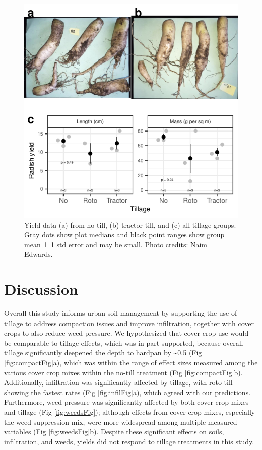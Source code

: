 \documentclass[
  12pt,
]{article}
\begin{document}
\begin{figure}
\centering
\includegraphics{merge_files/figure-latex/yieldFig-1.pdf}
\caption{\label{fig:yieldFig}Yield data (a) from no-till, (b) tractor-till, and (c) all tillage groups. Gray dots show plot medians and black point ranges show group mean ± 1 std error and may be small. Photo credits: Naim Edwards.}
\end{figure}

\hypertarget{discussion}{%
\section{Discussion}\label{discussion}}

Overall this study informs urban soil management by supporting the use of tillage to address compaction issues and improve infiltration, together with cover crops to also reduce weed pressure.
We hypothesized that cover crop use would be comparable to tillage effects, which was in part supported, because overall tillage significantly deepened the depth to hardpan by \textasciitilde0.5 (Fig \ref{fig:compactFig}a), which was within the range of effect sizes measured among the various cover crop mixes within the no-till treatment (Fig \ref{fig:compactFig}b).
Additionally, infiltration was significantly affected by tillage, with roto-till showing the fastest rates (Fig \ref{fig:infilFig}a), which agreed with our predictions.
Furthermore, weed pressure was significantly affected by both cover crop mixes and tillage (Fig \ref{fig:weedsFig}); although effects from cover crop mixes, especially the weed suppression mix, were more widespread among multiple measured variables (Fig \ref{fig:weedsFig}b).
Despite these significant effects on soils, infiltration, and weeds, yields did not respond to tillage treatments in this study.
\end{document}
